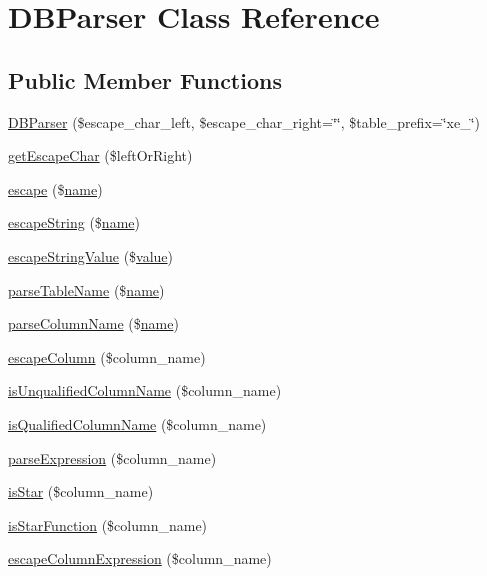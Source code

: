 \hypertarget{classDBParser}{}\section{D\+B\+Parser Class Reference}
\label{classDBParser}
\subsection*{Public Member Functions}
\begin{DoxyCompactItemize}
\item 
\hyperlink{classDBParser_a353eeb35ff30fb6de834a9341a143e31}{D\+B\+Parser} (\$escape\+\_\+char\+\_\+left, \$escape\+\_\+char\+\_\+right=\char`\"{}\char`\"{}, \$table\+\_\+prefix=\char`\"{}xe\+\_\+\char`\"{})
\item 
\hyperlink{classDBParser_aed9e06c08955d267a0576b178f37d6ee}{get\+Escape\+Char} (\$left\+Or\+Right)
\item 
\hyperlink{classDBParser_ac2807a8b1ef18ebf574078e60e1754c6}{escape} (\$\hyperlink{common_8js_a22c29d2aa8ed6161ce8faa718ef76e68}{name})
\item 
\hyperlink{classDBParser_acf60e21d6407197af743d97bc9158325}{escape\+String} (\$\hyperlink{common_8js_a22c29d2aa8ed6161ce8faa718ef76e68}{name})
\item 
\hyperlink{classDBParser_ac4a2f15f2cc6c4f0edf848cfc0005259}{escape\+String\+Value} (\$\hyperlink{jquery_8js_abe5393d870043cf6aaa1d5ad5fce755c}{value})
\item 
\hyperlink{classDBParser_ac4d949f99739a604bd7ee1ca7f14c946}{parse\+Table\+Name} (\$\hyperlink{common_8js_a22c29d2aa8ed6161ce8faa718ef76e68}{name})
\item 
\hyperlink{classDBParser_a4e9d7229c290a48fddd26c278f964dab}{parse\+Column\+Name} (\$\hyperlink{common_8js_a22c29d2aa8ed6161ce8faa718ef76e68}{name})
\item 
\hyperlink{classDBParser_a21799d785eb817b6df7871b895c91185}{escape\+Column} (\$column\+\_\+name)
\item 
\hyperlink{classDBParser_a049f95bd692b0d34a72f88f92091af6f}{is\+Unqualified\+Column\+Name} (\$column\+\_\+name)
\item 
\hyperlink{classDBParser_a927c668f7d1b2994743f9bdf6530ba58}{is\+Qualified\+Column\+Name} (\$column\+\_\+name)
\item 
\hyperlink{classDBParser_a44e806ac029512b9d54b2f44a0a6385f}{parse\+Expression} (\$column\+\_\+name)
\item 
\hyperlink{classDBParser_a73f99ee88bbe7c6bc871a67de4efa2b1}{is\+Star} (\$column\+\_\+name)
\item 
\hyperlink{classDBParser_a6a13c1cc9497af7dd0cb48e07b852947}{is\+Star\+Function} (\$column\+\_\+name)
\item 
\hyperlink{classDBParser_a98416a358e6b2647d03d967b28a11504}{escape\+Column\+Expression} (\$column\+\_\+name)
\end{DoxyCompactItemize}

